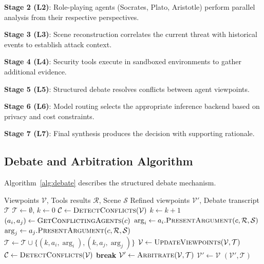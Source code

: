 \textbf{Stage 2 (L2)}: Role-playing agents (Socrates, Plato, Aristotle) perform parallel analysis from their respective perspectives.

\textbf{Stage 3 (L3)}: Scene reconstruction correlates the current threat with historical events to establish attack context.

\textbf{Stage 4 (L4)}: Security tools execute in sandboxed environments to gather additional evidence.

\textbf{Stage 5 (L5)}: Structured debate resolves conflicts between agent viewpoints.

\textbf{Stage 6 (L6)}: Model routing selects the appropriate inference backend based on privacy and cost constraints.

\textbf{Stage 7 (L7)}: Final synthesis produces the decision with supporting rationale.

\subsection{Debate and Arbitration Algorithm}
\label{subsec:debate-algorithm}

Algorithm~\ref{alg:debate} describes the structured debate mechanism.

\begin{algorithm}
\caption{Debate and Arbitration Algorithm}
\label{alg:debate}
\begin{algorithmic}[1]
\Require Viewpoints $\mathcal{V}$, Tools results $\mathcal{R}$, Scene $\mathcal{S}$
\Ensure Refined viewpoints $\mathcal{V}'$, Debate transcript $\mathcal{T}$
\State $\mathcal{T} \leftarrow \emptyset$, $k \leftarrow 0$
\State $\mathcal{C} \leftarrow \textsc{DetectConflicts}(\mathcal{V})$
    \State $k \leftarrow k + 1$
        \State $(a_i, a_j) \leftarrow \textsc{GetConflictingAgents}(c)$
        \State $\arg_i \leftarrow a_i.\textsc{PresentArgument}(c, \mathcal{R}, \mathcal{S})$
        \State $\arg_j \leftarrow a_j.\textsc{PresentArgument}(c, \mathcal{R}, \mathcal{S})$
        \State $\mathcal{T} \leftarrow \mathcal{T} \cup \{(k, a_i, \arg_i), (k, a_j, \arg_j)\}$
    \EndFor
    \State $\mathcal{V} \leftarrow \textsc{UpdateViewpoints}(\mathcal{V}, \mathcal{T})$
    \State $\mathcal{C} \leftarrow \textsc{DetectConflicts}(\mathcal{V})$
        \State \textbf{break}
    \EndIf
\EndWhile
{}
    \State $\mathcal{V}' \leftarrow \textsc{Arbitrate}(\mathcal{V}, \mathcal{T})$ 
\Else
    \State $\mathcal{V}' \leftarrow \mathcal{V}$
\EndIf
\State \Return $(\mathcal{V}', \mathcal{T})$
\end{algorithmic}
\end{algorithm}

